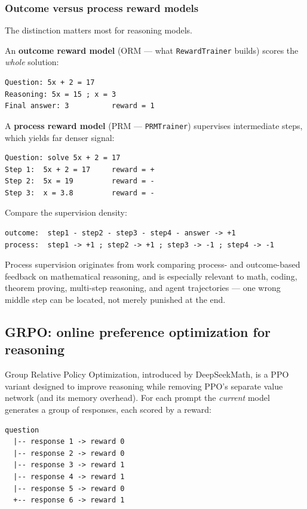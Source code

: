 \subsubsection{Outcome versus process reward models}

The distinction matters most for reasoning models.

An \textbf{outcome reward model} (ORM --- what \texttt{RewardTrainer}
builds) scores the \emph{whole} solution:

\begin{lstlisting}[language={},basicstyle=\small\ttfamily]
Question: 5x + 2 = 17
Reasoning: 5x = 15 ; x = 3
Final answer: 3          reward = 1
\end{lstlisting}

A \textbf{process reward model} (PRM --- \texttt{PRMTrainer}) supervises
intermediate steps, which yields far denser signal:

\begin{lstlisting}[language={},basicstyle=\small\ttfamily]
Question: solve 5x + 2 = 17
Step 1:  5x + 2 = 17     reward = +
Step 2:  5x = 19         reward = -
Step 3:  x = 3.8         reward = -
\end{lstlisting}

Compare the supervision density:

\begin{lstlisting}[language={},basicstyle=\small\ttfamily]
outcome:  step1 - step2 - step3 - step4 - answer -> +1
process:  step1 -> +1 ; step2 -> +1 ; step3 -> -1 ; step4 -> -1
\end{lstlisting}

Process supervision originates from work comparing process- and
outcome-based feedback on mathematical reasoning, and is especially
relevant to math, coding, theorem proving, multi-step reasoning, and agent
trajectories --- one wrong middle step can be located, not merely
punished at the end.

\subsection{GRPO: online preference optimization for reasoning}

Group Relative Policy Optimization, introduced by DeepSeekMath, is a PPO
variant designed to improve reasoning while removing PPO's separate value
network (and its memory overhead). For each prompt the \emph{current}
model generates a group of responses, each scored by a reward:

\begin{lstlisting}[language={},basicstyle=\small\ttfamily]
question
  |-- response 1 -> reward 0
  |-- response 2 -> reward 0
  |-- response 3 -> reward 1
  |-- response 4 -> reward 1
  |-- response 5 -> reward 0
  +-- response 6 -> reward 1
\end{lstlisting}

